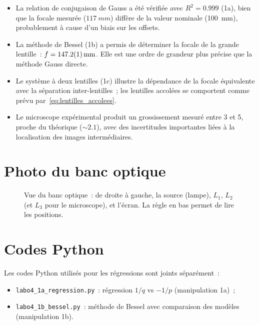 ﻿\documentclass[a4paper, 11pt]{article}
\begin{document}
\begin{itemize}
  \item La relation de conjugaison de Gauss a été vérifiée avec $R^2 = 0.999$ (1a), bien que la focale mesurée ($\SI{117}{mm}$) diffère de la valeur nominale (\SI{100}{mm}), probablement à cause d'un biais sur les offsets.
  \item La méthode de Bessel (1b) a permis de déterminer la focale de la grande lentille~: $f = \SI{147.2 \pm 0.1}{mm}$. Elle est une ordre de grandeur plus précise que la méthode Gauss directe.
  \item Le système à deux lentilles (1c) illustre la dépendance de la focale équivalente avec la séparation inter-lentilles~; les lentilles accolées se comportent comme prévu par~\eqref{eq:lentilles_accolees}.
  \item Le microscope expérimental produit un grossissement mesuré entre 3 et 5, proche du théorique ($\sim 2.1$), avec des incertitudes importantes liées à la localisation des images intermédiaires.
\end{itemize}

\appendix
\section{Photo du banc optique}

\begin{figure}[H]
  \centering
  \caption{Vue du banc optique~: de droite à gauche, la source (lampe), $L_1$, $L_2$ (et $L_3$ pour le microscope), et l'écran. La règle en bas permet de lire les positions.}
  \label{fig:banc}
\end{figure}

\section{Codes Python}

Les codes Python utilisés pour les régressions sont joints séparément~:
\begin{itemize}
  \item \texttt{labo4\_1a\_regression.py}~: régression $1/q$ vs $-1/p$ (manipulation 1a)~;
  \item \texttt{labo4\_1b\_bessel.py}~: méthode de Bessel avec comparaison des modèles (manipulation 1b).
\end{itemize}
\end{document}

